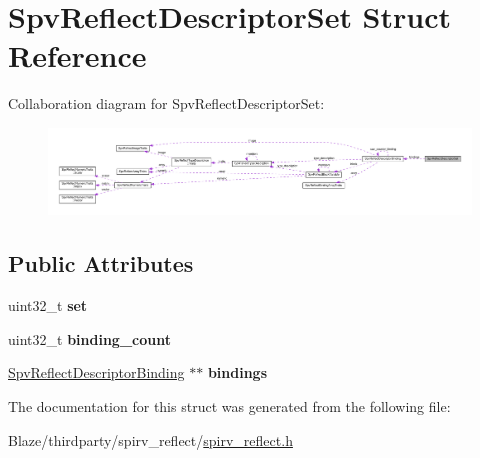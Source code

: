 \hypertarget{structSpvReflectDescriptorSet}{}\section{Spv\+Reflect\+Descriptor\+Set Struct Reference}
\label{structSpvReflectDescriptorSet}


Collaboration diagram for Spv\+Reflect\+Descriptor\+Set\+:\nopagebreak
\begin{figure}[H]
\begin{center}
\leavevmode
\includegraphics[width=350pt]{structSpvReflectDescriptorSet__coll__graph}
\end{center}
\end{figure}
\subsection*{Public Attributes}
\begin{DoxyCompactItemize}
\item 
\mbox{\label{structSpvReflectDescriptorSet_a3b6905363957bcfba704c38c2c268826}} 
uint32\+\_\+t {\bfseries set}
\item 
\mbox{\label{structSpvReflectDescriptorSet_a849e258dd489951dabc405d0655783b3}} 
uint32\+\_\+t {\bfseries binding\+\_\+count}
\item 
\mbox{\label{structSpvReflectDescriptorSet_a2a7e7a534af1f3bdbe7221bae9c53d5d}} 
\hyperlink{structSpvReflectDescriptorBinding}{Spv\+Reflect\+Descriptor\+Binding} $\ast$$\ast$ {\bfseries bindings}
\end{DoxyCompactItemize}


The documentation for this struct was generated from the following file\+:\begin{DoxyCompactItemize}
\item 
Blaze/thirdparty/spirv\+\_\+reflect/\hyperlink{spirv__reflect_8h}{spirv\+\_\+reflect.\+h}\end{DoxyCompactItemize}
